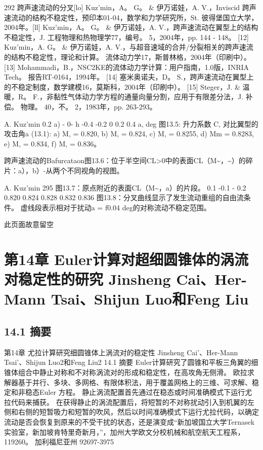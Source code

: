 \documentclass[UTF8,11pt,a4paper,openany,fontset=fandol]{ctexbook}
\begin{document}
292 跨声速流动的分叉[lo] Kuz'min，A。 G。 \& 伊万诺娃，A. V.，Inviscid 跨声速流动的结构不稳定性，预印本01-04，数学和力学研究所，St. 彼得堡国立大学，2004年。[ll] Kuz'min，A。 G。 \& 伊万诺娃，A. V.，跨声速流动在翼型上的结构不稳定性，J. 工程物理和热物理学77，编号。 5，2004年，pp. 144 - 148。 [12] Kuz'min，A. G。 \& 伊万诺娃，A. V.，与超音速域的合并/分裂相关的跨声速流的结构不稳定性，理论和计算。 流体动力学17，斯普林格，2004年（印刷中）。 [13] Mohammadi，B.，NSC2KE的流体动力学计算：用户指南，1.0版，INRIA Tech。 报告RT-0164，1994年。 [14] 塞米奥诺夫，D。 S.，跨声速流动在翼型上的不稳定制度，数学建模16，莫斯科，2004年（印刷中）。 [15] Steger，J. \& 温暖，R。 F.，非黏性气体动力学方程的通量向量分割，应用于有限差分法，J. 补偿。 物理。 40，不。 2，1983年，pp. 263-293。

A. Kuz'min 0.2 a) - 0- h -0.4 -0.2 0 0.2 0.4 a, deg 图13.5: 升力系数 C, 对比翼型的攻击角a (13.1): a) M, = 0.820, b) M, = 0.824, c) M, = 0.8255, d) Mm = 0.8283, e) M, = 0.834, f) M, = 0.836。

跨声速流动的Bafurcataon图13.6：位于半空间CL>0中的表面CL（M\textasciitilde{}，\textasciitilde{}）的碎片：a），b）-从两个不同视角的视图。

A. Kuz'min 295 图13.7：原点附近的表面CL（M\textasciitilde{}，a）的片段。 0.1 -0.1 - 0.2 0.820 0.824 0.828 0.832 0.836 图13.8：分叉曲线显示了发生流动重组的自由流条件。 虚线段表示相对于扰动a = f0.04 deg的对称流动不稳定范围。

此页面故意留空

\clearpage
\chapter{第14章 Euler计算对超细圆锥体的涡流对稳定性的研究 Jinsheng Cai、Her-Mann Tsai、Shijun Luo和Feng Liu}
\section{14.1 摘要}
第14章 尤拉计算研究细圆锥体上涡流对的稳定性 Jinsheng Cai'、Her-Mann Tsai'、Shijun Luo2和Feng Liu2 14.1 摘要 Euler计算研究了圆锥和平板三角翼的细锥体组合中静止对称和不对称涡流对的形成和稳定性，在高攻角无侧滑。 欧拉求解器基于并行、多块、多网格、有限体积法，用于覆盖网格上的三维、可求解、稳定和非稳态Euler 方程。 静止涡流配置首先通过在稳态或时间准确模式下运行尤拉代码来捕获。 在获得静止的涡流配置后，将短暂的不对称扰动引入到机翼的左侧和右侧的短暂吸力和短暂的吹风，然后以时间准确模式下运行尤拉代码，以确定流动是否会恢复到原来的不受干扰的状态，还是演变成“新加坡国立大学Ternasek实验室，新加坡肯特里奇新月，”，加州大学欧文分校机械和航空航天工程系，119260。 加利福尼亚州 92697-3975
\end{document}
